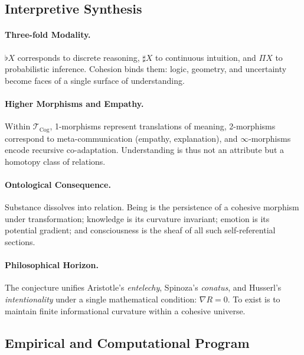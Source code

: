 \documentclass[12pt,a4paper,twoside,openright]{book}
\begin{document}
\subsection*{Interpretive Synthesis}

\paragraph{Three-fold Modality.}
$\flat X$ corresponds to discrete reasoning,
$\sharp X$ to continuous intuition,
and $\Pi X$ to probabilistic inference.
Cohesion binds them: logic, geometry, and uncertainty become
faces of a single surface of understanding.

\paragraph{Higher Morphisms and Empathy.}
Within $\mathcal{T}_{\mathrm{Cog}}$,
1-morphisms represent translations of meaning,
2-morphisms correspond to meta-communication (empathy, explanation),
and $\infty$-morphisms encode recursive co-adaptation.
Understanding is thus not an attribute but a homotopy class of relations.

\paragraph{Ontological Consequence.}
Substance dissolves into relation.
Being is the persistence of a cohesive morphism under transformation;
knowledge is its curvature invariant;
emotion is its potential gradient;
and consciousness is the sheaf of all such self-referential sections.

\paragraph{Philosophical Horizon.}
The conjecture unifies Aristotle’s \emph{entelechy},
Spinoza’s \emph{conatus},
and Husserl’s \emph{intentionality}
under a single mathematical condition:
\(
\nabla R=0
\).
To exist is to maintain finite informational curvature
within a cohesive universe.

\subsection*{Empirical and Computational Program}
\end{document}
